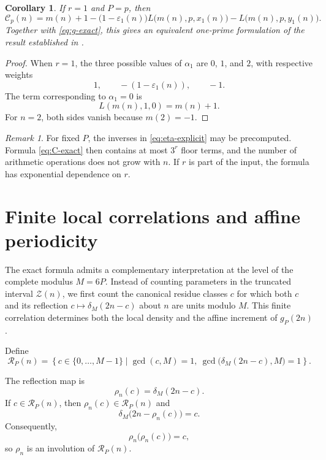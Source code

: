 \documentclass[12pt]{article}
\numberwithin{equation}{section}
\newtheorem{corollary}[theorem]{Corollary}
\theoremstyle{definition}
\theoremstyle{remark}
\newtheorem{remark}[theorem]{Remark}
\newcommand{\Ccal}{\mathcal C}
\newcommand{\Rcal}{\mathcal R}
\newcommand{\Zcal}{\mathcal Z}
\begin{document}
\begin{corollary}
\label{cor:r-one}
If $r=1$ and $P=p$, then
\begin{equation}
\label{eq:r-one-C}
\Ccal_p(n)
=
m(n)+1
-
\bigl(1-\varepsilon_1(n)\bigr)
L\bigl(m(n),p,x_1(n)\bigr)
-
L\bigl(m(n),p,y_1(n)\bigr).
\end{equation}
Together with \eqref{eq:g-exact}, this gives an equivalent
one-prime formulation of the result established in
\cite{Salazar2026}.
\end{corollary}

\begin{proof}
When $r=1$, the three possible values of $\alpha_1$ are
$0$, $1$, and $2$, with respective weights
\[
1,
\qquad
-(1-\varepsilon_1(n)),
\qquad
-1.
\]
The term corresponding to $\alpha_1=0$ is
\[
L(m(n),1,0)=m(n)+1.
\]
For $n=2$, both sides vanish because $m(2)=-1$.
\end{proof}

\begin{remark}
For fixed $P$, the inverses in \eqref{eq:eta-explicit} may be
precomputed. Formula \eqref{eq:C-exact} then contains at most
$3^r$ floor terms, and the number of arithmetic operations does
not grow with $n$. If $r$ is part of the input, the formula has
exponential dependence on $r$.
\end{remark}

\section{Finite local correlations and affine periodicity}

The exact formula admits a complementary interpretation at the
level of the complete modulus $M=6P$. Instead of counting
parameters in the truncated interval $\Zcal(n)$, we first count
the canonical residue classes $c$ for which both $c$ and its
reflection $c\mapsto\delta_M(2n-c)$ about $n$ are units modulo
$M$. This finite correlation determines both the local density
and the affine increment of $g_P(2n)$.

Define
\begin{equation}
\label{eq:R-definition}
\Rcal_P(n)
=
\left\{
c\in\{0,\dots,M-1\}
\mathrel{}\middle|\mathrel{}
\gcd(c,M)=1,\
\gcd\bigl(\delta_M(2n-c),M\bigr)=1
\right\}.
\end{equation}

The reflection map is
\begin{equation}
\label{eq:reflection}
\rho_n(c)
=
\delta_M(2n-c).
\end{equation}
If $c\in\Rcal_P(n)$, then $\rho_n(c)\in\Rcal_P(n)$ and
\[
\delta_M\bigl(2n-\rho_n(c)\bigr)=c.
\]
Consequently,
\[
\rho_n\bigl(\rho_n(c)\bigr)=c,
\]
so $\rho_n$ is an involution of $\Rcal_P(n)$.
\end{document}
